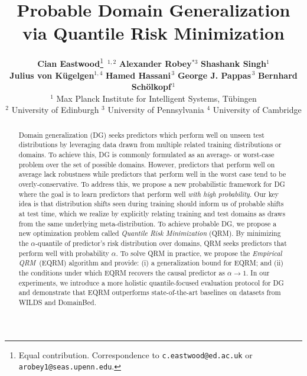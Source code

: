 \documentclass{article}
\title{Probable Domain Generalization \\ via Quantile Risk Minimization}
\author{%
  \textbf{Cian Eastwood}\thanks{Equal contribution. Correspondence to \texttt{c.eastwood@ed.ac.uk} or \texttt{arobey1@seas.upenn.edu}.}\, $^{1,2}$
  \quad \textbf{Alexander Robey}$^{* 3}$
  \quad \textbf{Shashank Singh}$^{1}$ \vspace{2mm}\\
  \textbf{Julius von K\"ugelgen}$^{1,4}$
  \quad \textbf{Hamed Hassani}$^{\,3}$
  \quad \textbf{George J. Pappas}$^{\,3}$
  \quad \textbf{Bernhard Sch\"olkopf}$^{\, 1}$ \vspace{4mm}\\ 
 $^{1}$ Max Planck Institute for Intelligent Systems, T\"ubingen \\
 $^{2}$ University of Edinburgh \quad $^{3}$ University of Pennsylvania \quad $^{4}$ University of Cambridge
}
\begin{document}
%
\doparttoc%
\faketableofcontents%
\part{}\vspace{-10mm}%
%
\maketitle
{}%

\begin{abstract}
\let\thefootnote\relax{}
Domain generalization (DG) seeks predictors which perform well on unseen test distributions by leveraging data drawn from multiple related training distributions or domains. To achieve this, DG is commonly formulated as an average- or worst-case problem over the set of possible domains. However, predictors that perform well on average lack robustness while predictors that perform well in the worst case tend to be overly-conservative. To address this, we propose a new probabilistic framework for DG where the goal is to learn predictors that perform well \emph{with high probability}. Our key idea is that distribution shifts seen during training should inform us of probable shifts at test time, which we realize by explicitly relating training and test domains as draws from the same underlying meta-distribution. To achieve probable DG, we propose a new optimization problem called \emph{Quantile Risk Minimization} (QRM). By minimizing the $\alpha$-quantile of predictor's risk distribution over domains, QRM seeks predictors that perform well with probability $\alpha$. To solve QRM in practice, we propose the \textit{Empirical QRM}~(EQRM) algorithm and provide: (i) a generalization bound for EQRM; and (ii) the conditions under which EQRM recovers the causal predictor as $\alpha\! \to\! 1$. In our experiments, we introduce a more holistic quantile-focused evaluation protocol for DG and demonstrate that EQRM outperforms state-of-the-art baselines on datasets from WILDS and DomainBed. 
\end{abstract}
\end{document}
